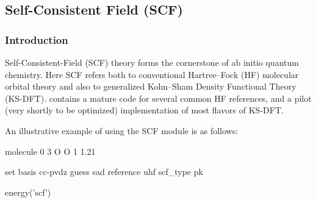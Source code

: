 \subsection{Self-Consistent Field (SCF)} \label{scf}

\subsubsection{Introduction}

Self-Consistent-Field (SCF) theory forms the cornerstone of ab initio quantum
chemistry. Here SCF refers both to conventional Hartree--Fock (HF) molecular
orbital theory and also to generalized Kohn--Sham Density Functional
Theory (KS-DFT). \PSIfour contains a mature code for several common HF
references, and a pilot (very shortly to be optimized) implementation of most
flavors of KS-DFT.

An illustrative example of using the SCF module is as follows:
\begin{Snippet}
molecule {
0 3
O
O 1 1.21
}

set {
basis cc-pvdz
guess sad
reference uhf
scf_type pk
}

energy('scf')
\end{Snippet}

